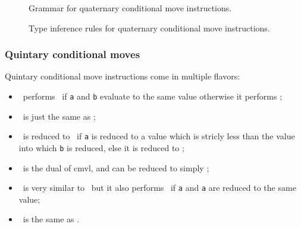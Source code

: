 \begin{figure}[H]
	\centering


	\caption{Grammar for quaternary conditional move instructions.}
	\label{fig:nstar-instructionset-registers-cmvX-quaternary-grammar}
\end{figure}

\begin{figure}[H]
	\centering


	\caption{Type inference rules for quaternary conditional move instructions.}
	\label{fig:nstar-instructionset-registers-cmvX-quaternary-typerules}
\end{figure}

\subsubsection{Quintary conditional moves}\label{subsubsec:nstar-instructionset-registers-cmvX-quintary}

Quintary conditional move instructions come in multiple flavors:
\begin{itemize}
	\item {}\ performs \ if \texttt{a} and \texttt{b} evaluate to the same value otherwise it performs ;
	\item {}\ is just the same as ;
	\item {}\ is reduced to \ if \texttt{a} is reduced to a value which is stricly less than the value into which \texttt{b} is reduced, else it is reduced to ;
	\item {}\ is the dual of {\Iformat cmvl}, and can be reduced to simply ;
	\item {}\ is very similar to \ but it also performs \ if \texttt{a} and \texttt{a} are reduced to the same value;
	\item {}\ is the same as .
\end{itemize}

